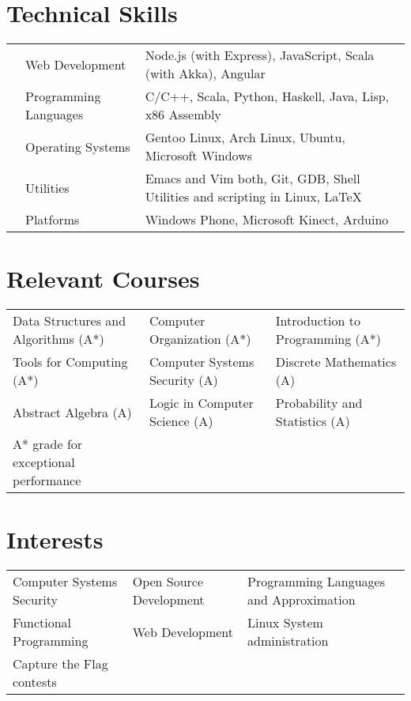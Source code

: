 \documentclass[11pt,a4paper]{moderncv}
\begin{document}
\section*{Technical Skills}
\begin{tabular}{L{0.05cm} L{5cm} l}
  &Web Development 	          &Node.js (with Express), JavaScript, Scala (with Akka), Angular\\
  &Programming Languages      &C/C++, Scala, Python, Haskell, Java,
                                Lisp, x86 Assembly\\
  &Operating Systems	        &Gentoo Linux, Arch Linux, Ubuntu, Microsoft Windows\\
  &Utilities                  &Emacs and Vim both, Git, GDB, Shell
                                Utilities and scripting in Linux, \LaTeX\\
  &Platforms                  &Windows Phone, Microsoft Kinect, Arduino\\
\end{tabular}

\section*{Relevant Courses}
\begin{tabular}{L{6.8cm} L{6.0cm} l}
  Data Structures and Algorithms (A*) & Computer Organization (A*)
  & Introduction to Programming (A*)\\
  Tools for Computing (A*) & Computer Systems Security (A)
  & Discrete Mathematics (A)\\
  Abstract Algebra (A) & Logic in Computer Science (A)
  & Probability and Statistics (A)\\
  \vspace{0.3cm}
  \footnotesize{A* grade for exceptional performance} & &
\end{tabular}

\section*{Interests}
\begin{tabular}{L{5.5cm} L{5.5cm} l}
  Computer Systems Security & Open Source Development
  & Programming Languages and Approximation\\
  Functional Programming & Web Development
  & Linux System administration\\
  Capture the Flag contests & &
\end{tabular}
\end{document}
